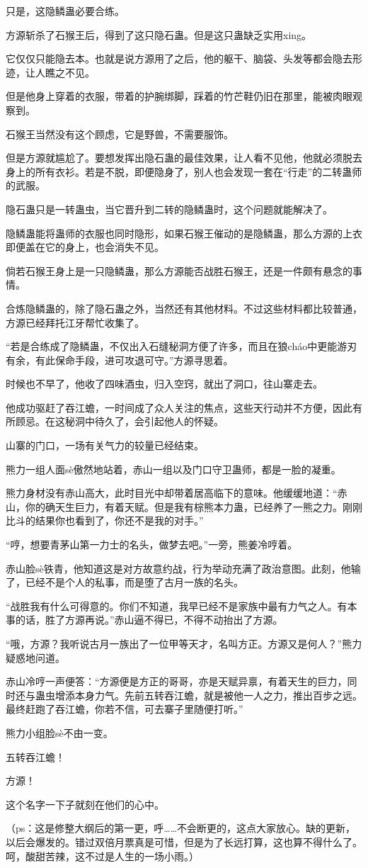 \begin{this_body}
只是，这隐鳞蛊必要合练。

方源斩杀了石猴王后，得到了这只隐石蛊。但是这只蛊缺乏实用xing。

它仅仅只能隐去本。也就是说方源用了之后，他的躯干、脑袋、头发等都会隐去形迹，让人瞧之不见。

但是他身上穿着的衣服，带着的护腕绑脚，踩着的竹芒鞋仍旧在那里，能被肉眼观察到。

石猴王当然没有这个顾虑，它是野兽，不需要服饰。

但是方源就尴尬了。要想发挥出隐石蛊的最佳效果，让人看不见他，他就必须脱去身上的所有衣衫。若是不脱，即便隐身了，别人也会发现一套在“行走”的二转蛊师的武服。

隐石蛊只是一转蛊虫，当它晋升到二转的隐鳞蛊时，这个问题就能解决了。

隐鳞蛊能将蛊师的衣服也同时隐形，如果石猴王催动的是隐鳞蛊，那么方源的上衣即便盖在它的身上，也会消失不见。

倘若石猴王身上是一只隐鳞蛊，那么方源能否战胜石猴王，还是一件颇有悬念的事情。

合炼隐鳞蛊的，除了隐石蛊之外，当然还有其他材料。不过这些材料都比较普通，方源已经拜托江牙帮忙收集了。

“若是合练成了隐鳞蛊，不仅出入石缝秘洞方便了许多，而且在狼cháo中更能游刃有余，有此保命手段，进可攻退可守。”方源寻思着。

时候也不早了，他收了四味酒虫，归入空窍，就出了洞口，往山寨走去。

他成功驱赶了吞江蟾，一时间成了众人关注的焦点，这些天行动并不方便，因此有所顾忌。在这秘洞中待久了，会引起他人的怀疑。

山寨的门口，一场有关气力的较量已经结束。

熊力一组人面sè傲然地站着，赤山一组以及门口守卫蛊师，都是一脸的凝重。

熊力身材没有赤山高大，此时目光中却带着居高临下的意味。他缓缓地道：“赤山，你的确天生巨力，有着天赋。但是我有棕熊本力蛊，已经养了一熊之力。刚刚比斗的结果你也看到了，你还不是我的对手。”

“哼，想要青茅山第一力士的名头，做梦去吧。”一旁，熊姜冷哼着。

赤山脸sè铁青，他知道这是对方故意约战，行为举动充满了政治意图。此刻，他输了，已经不是个人的私事，而是堕了古月一族的名头。

“战胜我有什么可得意的。你们不知道，我早已经不是家族中最有力气之人。有本事的话，胜了方源再说。”赤山逼不得已，不得不动抬出了方源。

“哦，方源？我听说古月一族出了一位甲等天才，名叫方正。方源又是何人？”熊力疑惑地问道。

赤山冷哼一声便答：“方源便是方正的哥哥，亦是天赋异禀，有着天生的巨力，同时还与蛊虫增添本身力气。先前五转吞江蟾，就是被他一人之力，推出百步之远。最终赶跑了吞江蟾，你若不信，可去寨子里随便打听。”

熊力小组脸sè不由一变。

五转吞江蟾！

方源！

这个名字一下子就刻在他们的心中。

（ps：这是修整大纲后的第一更，呼……不会断更的，这点大家放心。缺的更新，以后会爆发的。错过双倍月票真是可惜，但是为了长远打算，这也算不得什么了。呵，酸甜苦辣，这不过是人生的一场小雨。）

\end{this_body}

